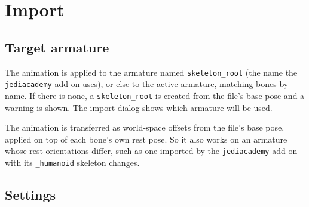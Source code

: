 \documentclass[a4paper,10pt]{article}
\begin{document}
 \section{Import}

 \subsection{Target armature}

 The animation is applied to the armature named \texttt{skeleton\_root} (the name the
 \texttt{jediacademy} add-on uses), or else to the active armature, matching bones by name. If there
 is none, a \texttt{skeleton\_root} is created from the file's base pose and a warning is shown. The
 import dialog shows which armature will be used.

 The animation is transferred as world-space offsets from the file's base pose, applied on top of
 each bone's own rest pose. So it also works on an armature whose rest orientations differ, such as
 one imported by the \texttt{jediacademy} add-on with its \texttt{\_humanoid} skeleton changes.

 \subsection{Settings}
\end{document}
